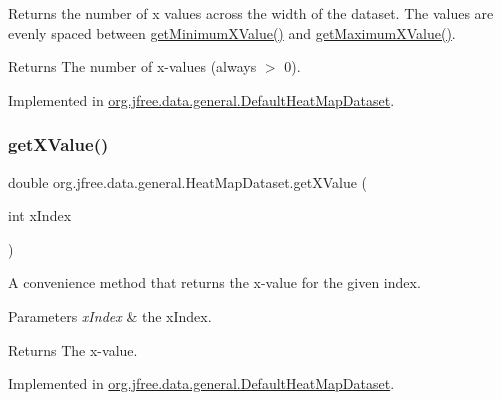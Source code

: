 Returns the number of x values across the width of the dataset. The values are evenly spaced between \mbox{\hyperlink{interfaceorg_1_1jfree_1_1data_1_1general_1_1_heat_map_dataset_aa2c36fac599d77d64ea85f069eba243c}{get\+Minimum\+X\+Value()}} and \mbox{\hyperlink{interfaceorg_1_1jfree_1_1data_1_1general_1_1_heat_map_dataset_a252f69b25ce64302493167c5e8576cfe}{get\+Maximum\+X\+Value()}}.

\begin{DoxyReturn}{Returns}
The number of x-\/values (always $>$ 0). 
\end{DoxyReturn}


Implemented in \mbox{\hyperlink{classorg_1_1jfree_1_1data_1_1general_1_1_default_heat_map_dataset_a0dd847578301662deb9a9880a603e7f1}{org.\+jfree.\+data.\+general.\+Default\+Heat\+Map\+Dataset}}.

\mbox{\label{interfaceorg_1_1jfree_1_1data_1_1general_1_1_heat_map_dataset_a9643f543086498022123fc43301c4788}} 
\subsubsection{\texorpdfstring{get\+X\+Value()}{getXValue()}}
{\footnotesize\ttfamily double org.\+jfree.\+data.\+general.\+Heat\+Map\+Dataset.\+get\+X\+Value (\begin{DoxyParamCaption}\item[{int}]{x\+Index }\end{DoxyParamCaption})}

A convenience method that returns the x-\/value for the given index.


\begin{DoxyParams}{Parameters}
{\em x\+Index} & the x\+Index.\\
\hline
\end{DoxyParams}
\begin{DoxyReturn}{Returns}
The x-\/value. 
\end{DoxyReturn}


Implemented in \mbox{\hyperlink{classorg_1_1jfree_1_1data_1_1general_1_1_default_heat_map_dataset_a812c8041769c20ca2db0dcf5f3622376}{org.\+jfree.\+data.\+general.\+Default\+Heat\+Map\+Dataset}}.

